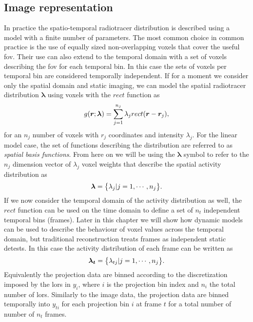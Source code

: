 \subsection{Image representation}
In practice the spatio-temporal radiotracer distribution is described using a model with a finite number of parameters. The most common choice in common practice is the use of equally sized non-overlapping voxels that cover the useful \gls{fov}. Their use can also extend to the temporal domain with a set of voxels describing the \gls{fov} for each temporal bin. In this case the sets of voxels per temporal bin are considered temporally independent.
If for a moment we consider only the spatial domain and static imaging, we can model the spatial radiotracer distribution $\bm{\lambda}$ using voxels with the  $rect$ function as
\begin{equation}
   g(\bm{r};\bm\lambda) = \sum_{j=1}^{n_{j}} \lambda_j {rect}(\bm{r}-\bm{r}_j)  \\, 
\end{equation}
for an ${n_{j}}$ number of voxels with $r_j$ coordinates and intensity $\lambda_j$.
For the linear model case, the set of functions describing the distribution are referred to as \textit{spatial basis functions}. From here on we will be using the $\bm\lambda$ symbol to refer to the ${n_{j}}$ dimension vector of $\lambda_j$ voxel weights that describe the spatial activity distribution as 
\begin{equation}
   \bm\lambda = \big\{ \lambda_j| j=1,\cdots,n_j \big\} \\.
\end{equation}
If we now consider the temporal domain of the activity distribution as well, the $rect$ function can be used 
on the time domain to define a set of $n_t$ independent temporal bins (frames). Later in this chapter we will show how dynamic models can be used to describe the behaviour of voxel values across the temporal domain, but traditional reconstruction treats frames as independent static detests.
In this case the activity distribution of each frame can be written as
\begin{equation}
   \bm{\lambda_t} = \big\{ {\lambda_{tj}| j=1,\cdots,n_j} \big\} \\.
\end{equation}
Equivalently the projection data are binned according to the discretization imposed by the \glspl{lor} in $y_i$, where $i$ is the projection bin index and $n_i$ the total number of \glspl{lor}. Similarly to the image data, the projection data are binned temporally into $y_{ti}$ for each projection bin $i$ at frame $t$ for a total number of number of $n_t$ frames. 
